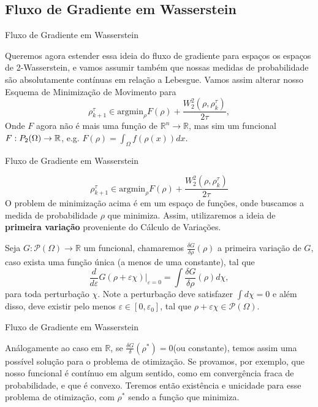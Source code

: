 \documentclass[10pt]{beamer}
\begin{document}
\subsection{Fluxo de Gradiente em Wasserstein}
\begin{frame}[fragile]{Fluxo de Gradiente em Wasserstein}

	Queremos agora estender essa ideia do fluxo de gradiente
	para espaços os espaços de 2-Wasserstein, e vamos assumir também
	que nossas medidas de probabilidade são absolutamente contínuas em relação a Lebesgue.
	Vamos assim
	alterar nosso Esquema de Minimização de Movimento para
	\begin{equation}
		\rho_{k+1}^\tau \in \text{argmin}_{\rho} F(\rho)+\frac{W_2^2(\rho,\rho_k^\tau)}{2\tau},
		\label{EMMW}
	\end{equation}
	Onde $F$ agora não é mais uma função de $\mathbb R^n \to \mathbb R$, mas sim
	um funcional $F: \mathbb \mathcal P_2(\Omega) \to \mathbb R$, e.g.
	$F(\rho) = \int_\Omega f(\rho(x))dx$.

\end{frame}

\begin{frame}[fragile]{Fluxo de Gradiente em Wasserstein}

	\begin{equation}
		\rho_{k+1}^\tau \in \text{argmin}_{\rho} F(\rho)+\frac{W_2^2(\rho,\rho_k^\tau)}{2\tau}
	\end{equation}
	O problem de minimização acima é em um espaço de funções, onde buscamos a medida de
	probabilidade $\rho$ que minimiza. Assim, utilizaremos a ideia de \textbf{primeira variação}
	proveniente do Cálculo de Variações.

	Seja $G: \mathcal P(\Omega) \to \mathbb R$ um funcional, chamaremos
	$\frac{\delta G}{\delta \rho}(\rho)$ a primeira variação de $G$, caso
	exista uma função única (a menos de uma constante), tal que
	\begin{equation}
		\frac{d}{d\varepsilon} G(\rho + \varepsilon \chi)|_{\varepsilon =0} =
		\int \frac{\delta G}{\delta \rho}(\rho) d\chi,
	\end{equation}
	para toda perturbação $\chi$. Note a perturbação deve satisfazer $\int d\chi = 0$
	e além disso, deve existir pelo menos $\varepsilon \in [0,\varepsilon_0]$, tal
	que $\rho + \varepsilon \chi \in \mathcal P(\Omega)$.

\end{frame}

\begin{frame}[fragile]{Fluxo de Gradiente em Wasserstein}

	Análogamente ao caso em $\mathbb R$,
	se $\frac{\delta G}{\delta}(\rho^*) = 0$(ou constante), temos assim
	uma possível solução para o problema de otimização. Se provamos,
	por exemplo, que nosso funcional é contínuo
	em algum sentido, como em convergência fraca de probabilidade, e que
	é convexo. Teremos então existência e unicidade para esse problema de otimização,
	com $\rho^*$ sendo a função que minimiza.

\end{frame}
\end{document}
